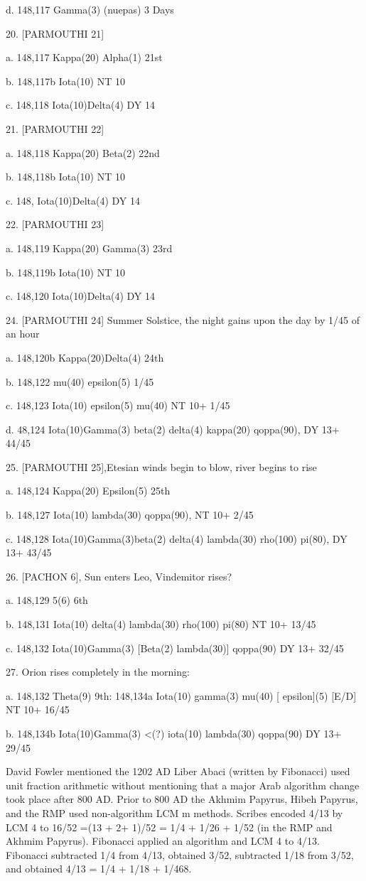 \documentclass[12pt]{article}
\begin{document}
d. 148,117 Gamma(3) (nuepas) 3 Days

20. [PARMOUTHI 21]

a. 148,117 Kappa(20) Alpha(1) 21st

b. 148,117b Iota(10) NT 10

c. 148,118 Iota(10)Delta(4) DY 14

21. [PARMOUTHI 22]

a. 148,118 Kappa(20) Beta(2) 22nd

b. 148,118b Iota(10) NT 10

c. 148, Iota(10)Delta(4) DY 14

22. [PARMOUTHI 23]

a. 148,119 Kappa(20) Gamma(3) 23rd

b. 148,119b Iota(10) NT 10

c. 148,120 Iota(10)Delta(4) DY 14

24. [PARMOUTHI 24] Summer Solstice, the night gains upon the day by 1/45 of an hour

a. 148,120b Kappa(20)Delta(4) 24th

b. 148,122 mu(40) epsilon(5) 1/45

c. 148,123 Iota(10) epsilon(5) mu(40) NT 10+ 1/45

d. 48,124 Iota(10)Gamma(3) beta(2) delta(4) kappa(20) qoppa(90), DY 13+ 44/45

25. [PARMOUTHI 25],Etesian winds begin to blow, river begins to rise

a. 148,124 Kappa(20) Epsilon(5) 25th

b. 148,127 Iota(10) lambda(30) qoppa(90), NT 10+ 2/45

c. 148,128 Iota(10)Gamma(3)beta(2) delta(4) lambda(30) rho(100) pi(80), DY 13+ 43/45

26. [PACHON 6], Sun enters Leo, Vindemitor rises?

a. 148,129 5(6) 6th

b. 148,131 Iota(10) delta(4) lambda(30) rho(100) pi(80) NT 10+ 13/45

c. 148,132 Iota(10)Gamma(3) [Beta(2) lambda(30)] qoppa(90) DY 13+ 32/45

27. Orion rises completely in the morning:

a. 148,132 Theta(9) 9th: 148,134a Iota(10) gamma(3) mu(40) [ epsilon](5) [E/D] NT 10+ 16/45

b. 148,134b Iota(10)Gamma(3) <(?) iota(10) lambda(30) qoppa(90) DY 13+ 29/45

David Fowler mentioned the 1202 AD Liber Abaci (written by Fibonacci) used unit fraction arithmetic without mentioning that a major Arab algorithm change took place after 800 AD. Prior to 800 AD the Akhmim Papyrus, Hibeh Papyrus, and the RMP used non-algorithm LCM m methods. Scribes encoded 4/13 by LCM 4 to 16/52 =(13 + 2+ 1)/52 = 1/4 + 1/26 + 1/52 (in the RMP and Akhmim Papyrus). Fibonacci applied an algorithm and LCM 4 to 4/13. Fibonacci subtracted 1/4 from 4/13, obtained 3/52, subtracted 1/18 from 3/52, and obtained 4/13 = 1/4 + 1/18 + 1/468. 
\end{document}
